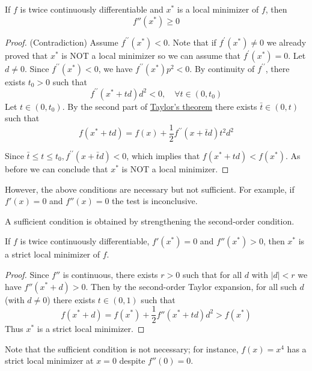 \begin{theorem}
If \(f\) is twice continuously differentiable and \(x^*\) is a local minimizer of \(f\), then
\[
f''(x^*)\ge 0
\]
\end{theorem}
\begin{proof}
(Contradiction)
Assume $f^{\prime \prime}\left(x^*\right)<0$. Note that if $f^{\prime}\left(x^*\right) \neq 0$ we already proved that $x^*$ is NOT a local minimizer so we can assume that $f^{\prime}\left(x^*\right)=0$. Let $d \neq 0$. Since $f^{\prime \prime}\left(x^*\right)<0$, we have $f^{\prime \prime}\left(x^*\right) p^2<0$. By continuity of $f^{\prime \prime}$, there exists $t_0>0$ such that
$$
f^{\prime \prime}\left(x^*+t d\right) d^2<0, \quad \forall t \in\left(0, t_0\right)
$$
Let $t \in\left(0, t_0\right)$. By the second part of \hyperref[thm:univariate_taylor_expansion]{Taylor's theorem} there exists $\bar{t} \in(0, t)$ such that
$$
f\left(x^*+t d\right)=f(x)+\frac{1}{2} f^{\prime \prime}(x+\bar{t} d) t^2 d^2
$$


Since $\bar{t} \leq t \leq t_0, f^{\prime \prime}(x+\bar{t} d)<0$, which implies that $f\left(x^*+t d\right)<f\left(x^*\right)$. As before we can conclude that $x^*$ is NOT a local minimizer.
\end{proof}

However, the above conditions are necessary but not sufficient. For example, if \(f'(x)=0\) and \(f''(x)=0\) the test is inconclusive.

A sufficient condition is obtained by strengthening the second-order condition.

\begin{theorem}
If \(f\) is twice continuously differentiable, \(f'(x^*)=0\) and \(f''(x^*)>0\), then \(x^*\) is a strict local minimizer of \(f\).
\end{theorem}
\begin{proof}
Since \(f''\) is continuous, there exists \(r>0\) such that for all \(d\) with \(|d|<r\) we have \(f''(x^*+d)>0\). 
Then by the second-order Taylor expansion, for all such \(d\) (with \(d\ne0\)) there exists \(t\in(0,1)\) such that
\[
f(x^*+d)=f(x^*)+\frac{1}{2}f''\left(x^*+t d\right)d^2>f(x^*)
\]
Thus \(x^*\) is a strict local minimizer.
\end{proof}

\begin{remark}
Note that the sufficient condition is not necessary; for instance, \(f(x)=x^4\) has a strict local minimizer at \(x=0\) despite \(f''(0)=0\).
\end{remark}

